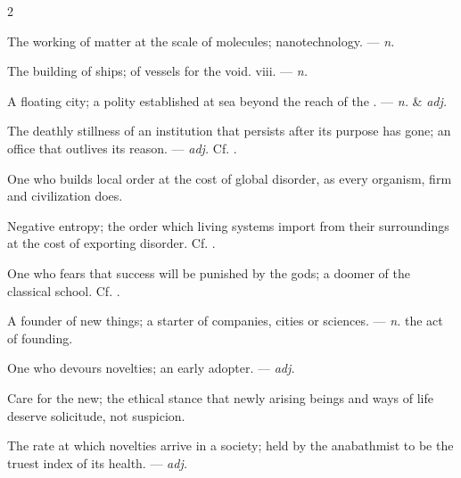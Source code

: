 \begin{multicols}{2}

 The working of matter at the scale of molecules; nanotechnology. —  \textit{n.}

 The building of ships;  of vessels for the void.   viii. —  \textit{n.}

 A floating city; a polity established at sea beyond the reach of the . —  \textit{n.} \& \textit{adj.}

 The deathly stillness of an institution that persists after its purpose has gone; an office that outlives its reason. —  \textit{adj.} Cf. .

 One who builds local order at the cost of global disorder, as every organism, firm and civilization does.

 Negative entropy; the order which living systems import from their surroundings at the cost of exporting disorder. Cf. .

 One who fears that success will be punished by the gods; a doomer of the classical school. Cf. .

 A founder of new things; a starter of companies, cities or sciences.  —  \textit{n.} the act of founding.

 One who devours novelties; an early adopter.   —  \textit{adj.}

 Care for the new; the ethical stance that newly arising beings and ways of life deserve solicitude, not suspicion.

 The rate at which novelties arrive in a society; held by the anabathmist to be the truest index of its health. —  \textit{adj.}


\end{multicols}
